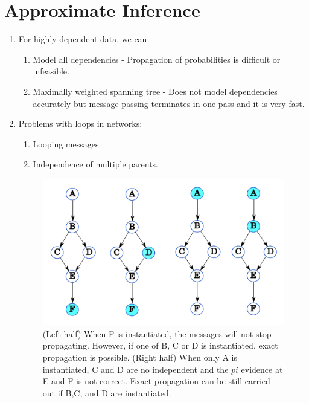\documentclass[12pt,twoside]{article}
\begin{document}
\section{Approximate Inference}
\begin{enumerate}

	\item For highly dependent data, we can:
		\begin{enumerate}
			\item Model all dependencies - Propagation of probabilities is difficult or infeasible.
			\item Maximally weighted spanning tree - Does not model dependencies accurately but message passing terminates in one pass and it is very fast.
		\end{enumerate}
		
	\item Problems with loops in networks:
		\begin{enumerate}
			\item Looping messages.
			\item Independence of multiple parents.
		\end{enumerate}	
	
\begin{figure}[H]
	\begin{center}
		\includegraphics[width = 0.8\hsize]{./figures/LoopsParents.png} %
			\caption{(Left half) When F is instantiated, the messages will not stop propagating. However, if one of B, C or D is instantiated, exact propagation is possible. (Right half) When only A is instantiated, C and D are no independent and the $pi$ evidence at E and F is not correct. Exact propagation can be still carried out if B,C, and D are instantiated.} %
		\label{fig:NaiveBayes} %
\end{center}
\end{figure}	
	

\end{enumerate}
\end{document}
